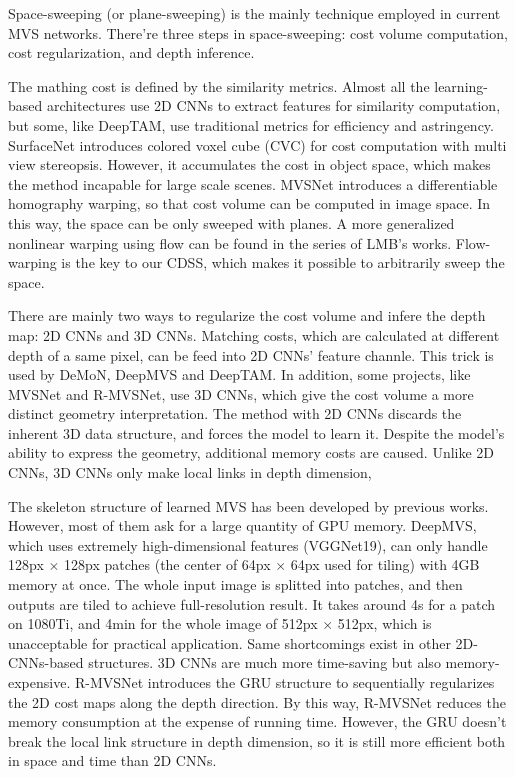 \documentclass{elegantpaper}
\begin{document}
 Space-sweeping\cite{517097} (or plane-sweeping\cite{4270270}) is the mainly technique employed in current MVS networks. There're three steps in space-sweeping: cost volume computation, cost regularization, and depth inference.

 The mathing cost is defined by the similarity metrics. Almost all the learning-based architectures use 2D CNNs to extract features for similarity computation, but some, like DeepTAM\cite{ZUB18}, use traditional metrics for efficiency and astringency. SurfaceNet\cite{DBLP:journals/corr/abs-1708-01749} introduces colored voxel cube (CVC) for cost computation with multi view stereopsis. However, it accumulates the cost in object space, which makes the method incapable for large scale scenes. MVSNet introduces a differentiable homography warping, so that cost volume can be computed in image space. In this way, the space can be only sweeped with planes. A more generalized nonlinear warping using flow can be found in the series of LMB's works\cite{ISKB18}\cite{ZUB18}. Flow-warping is the key to our CDSS, which makes it possible to arbitrarily sweep the space.

 There are mainly two ways to regularize the cost volume and infere the depth map: 2D CNNs and 3D CNNs. Matching costs, which are calculated at different depth of a same pixel, can be feed into 2D CNNs' feature channle. This trick is used by DeMoN, DeepMVS and DeepTAM. In addition, some projects, like MVSNet and R-MVSNet, use 3D CNNs, which give the cost volume a more distinct geometry interpretation. The method with 2D CNNs discards the inherent 3D data structure, and forces the model to learn it. Despite the model's ability to express the geometry, additional memory costs are caused. Unlike 2D CNNs, 3D CNNs only make local links in depth dimension,

 The skeleton structure of learned MVS has been developed by previous works. However, most of them ask for a large quantity of GPU memory. DeepMVS, which uses extremely high-dimensional features (VGGNet19\cite{Simonyan14c}), can only handle 128px $\times$ 128px patches (the center of 64px $\times$ 64px used for tiling) with 4GB memory at once. The whole input image is splitted into patches, and then outputs are tiled to achieve full-resolution result. It takes around 4s for a patch on 1080Ti, and 4min for the whole image of 512px $\times$ 512px, which is unacceptable for practical application. Same shortcomings exist in other 2D-CNNs-based structures. 3D CNNs are much more time-saving but also memory-expensive. R-MVSNet introduces the GRU structure to sequentially regularizes the 2D cost maps along the depth direction. By this way, R-MVSNet reduces the memory consumption at the expense of running time. However, the GRU doesn't break the local link structure in depth dimension, so it is still more efficient both in space and time than 2D CNNs. 
\end{document}
